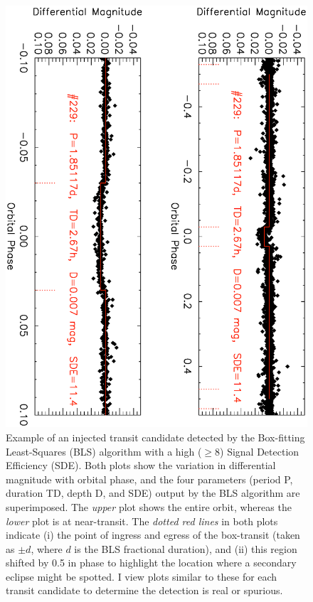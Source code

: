 \begin{figure}
\begin{center}
\centering
\includegraphics[width=.75\textwidth, angle=90]{7_highsde}
\caption[Example of an injected transit candidate with a high SDE]{%
Example of an injected transit candidate detected by the Box-fitting Least-Squares (BLS) algorithm with a high ($\geq$8) Signal Detection Efficiency (SDE).
Both plots show the variation in differential magnitude with orbital phase, and the four parameters (period P, duration TD, depth D, and SDE) output by the BLS algorithm are superimposed.
The {\it upper} plot shows the entire orbit, whereas the {\it lower} plot is at near-transit.
The {\it dotted red lines} in both plots indicate (i) the point of ingress and egress of the box-transit (taken as $\pm d$, where $d$ is the BLS fractional duration), and (ii) this region shifted by 0.5 in phase to highlight the location where a secondary eclipse might be spotted. 
I view plots similar to these for each transit candidate to determine the detection is real or spurious.%
}
\label{cha:human:sec:model:fig:highsde}
\end{center}
\end{figure}


